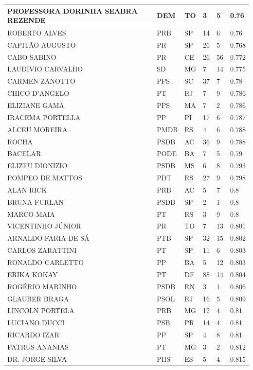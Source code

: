 \begin{apendicesenv}
\begin{longtable}{|L{4cm}|C{2cm}|C{1cm}|C{2cm}|C{1cm}|C{2cm}|}
PROFESSORA DORINHA SEABRA REZENDE & DEM & TO & 3 & 5 & 0.76 \\ \hline
ROBERTO ALVES & PRB & SP & 14 & 6 & 0.76 \\ \hline
CAPITÃO AUGUSTO & PR & SP & 26 & 5 & 0.768 \\ \hline
CABO SABINO & PR & CE & 26 & 56 & 0.772 \\ \hline
LAUDIVIO CARVALHO & SD & MG & 7 & 14 & 0.775 \\ \hline
CARMEN ZANOTTO & PPS & SC & 37 & 7 & 0.78 \\ \hline
CHICO D'ANGELO & PT & RJ & 7 & 9 & 0.786 \\ \hline
ELIZIANE GAMA & PPS & MA & 7 & 2 & 0.786 \\ \hline
IRACEMA PORTELLA & PP & PI & 17 & 6 & 0.787 \\ \hline
ALCEU MOREIRA & PMDB & RS & 4 & 6 & 0.788 \\ \hline
ROCHA & PSDB & AC & 36 & 9 & 0.788 \\ \hline
BACELAR & PODE & BA & 7 & 5 & 0.79 \\ \hline
ELIZEU DIONIZIO & PSDB & MS & 6 & 8 & 0.793 \\ \hline
POMPEO DE MATTOS & PDT & RS & 27 & 9 & 0.798 \\ \hline
ALAN RICK & PRB & AC & 5 & 7 & 0.8 \\ \hline
BRUNA FURLAN & PSDB & SP & 2 & 1 & 0.8 \\ \hline
MARCO MAIA & PT & RS & 3 & 9 & 0.8 \\ \hline
VICENTINHO JÚNIOR & PR & TO & 7 & 13 & 0.801 \\ \hline
ARNALDO FARIA DE SÁ & PTB & SP & 32 & 15 & 0.802 \\ \hline
CARLOS ZARATTINI & PT & SP & 11 & 6 & 0.803 \\ \hline
RONALDO CARLETTO & PP & BA & 5 & 12 & 0.803 \\ \hline
ERIKA KOKAY & PT & DF & 88 & 14 & 0.804 \\ \hline
ROGÉRIO MARINHO & PSDB & RN & 3 & 1 & 0.806 \\ \hline
GLAUBER BRAGA & PSOL & RJ & 16 & 5 & 0.809 \\ \hline
LINCOLN PORTELA & PRB & MG & 12 & 4 & 0.81 \\ \hline
LUCIANO DUCCI & PSB & PR & 14 & 4 & 0.81 \\ \hline
RICARDO IZAR & PP & SP & 4 & 8 & 0.81 \\ \hline
PATRUS ANANIAS & PT & MG & 3 & 2 & 0.812 \\ \hline
DR. JORGE SILVA & PHS & ES & 5 & 4 & 0.815 \\ \hline

\end{longtable}
\end{apendicesenv}
